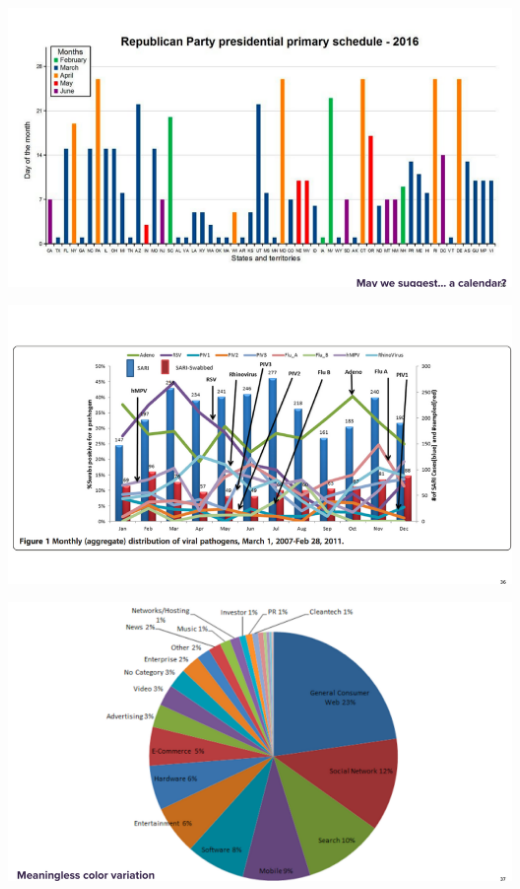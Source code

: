 \documentclass[
  ignorenonframetext,
]{beamer}
\begin{document}
\begin{frame}{}
\protect\hypertarget{section-23}{}
\includegraphics{hallofshame_figs/fig_34.png}
\end{frame}

\begin{frame}{}
\protect\hypertarget{section-24}{}
\includegraphics{hallofshame_figs/fig_35.png}
\end{frame}

\begin{frame}{}
\protect\hypertarget{section-25}{}
\includegraphics{hallofshame_figs/fig_36.png}
\end{frame}
\end{document}

